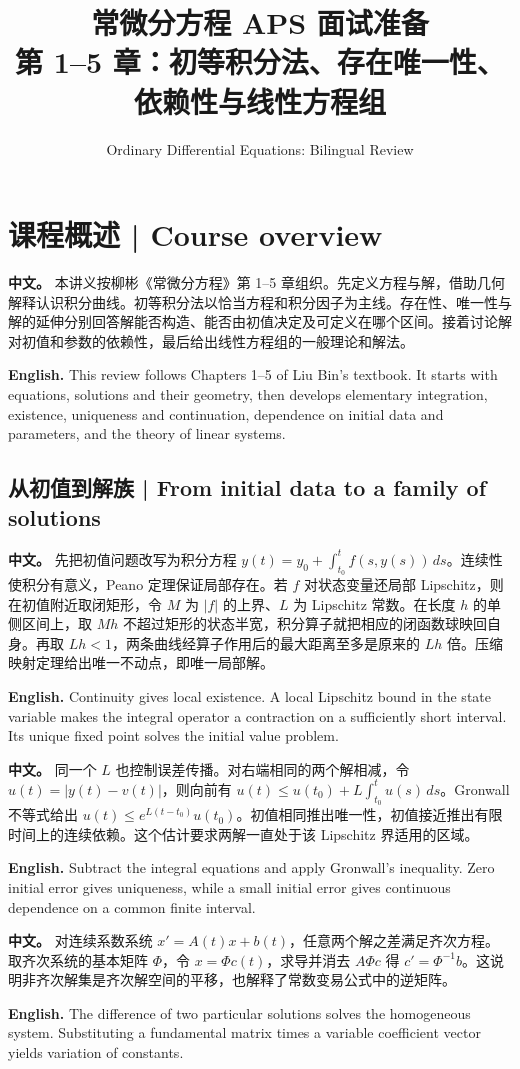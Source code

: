 \documentclass[UTF8,11pt,a4paper]{ctexart}
\title{常微分方程 APS 面试准备\\[4pt]\large 第 1--5 章：初等积分法、存在唯一性、依赖性与线性方程组}
\author{Ordinary Differential Equations: Bilingual Review}
\date{}
\newcommand{\APS}[2]{\par\noindent\textbf{中文。} #1\par\noindent\textbf{English.} #2\par}
\begin{document}
\maketitle
\section*{课程概述 | Course overview}
\APS{本讲义按柳彬《常微分方程》第 1--5 章组织。先定义方程与解，借助几何解释认识积分曲线。初等积分法以恰当方程和积分因子为主线。存在性、唯一性与解的延伸分别回答解能否构造、能否由初值决定及可定义在哪个区间。接着讨论解对初值和参数的依赖性，最后给出线性方程组的一般理论和解法。}{This review follows Chapters 1--5 of Liu Bin's textbook. It starts with equations, solutions and their geometry, then develops elementary integration, existence, uniqueness and continuation, dependence on initial data and parameters, and the theory of linear systems.}
\subsection*{从初值到解族 | From initial data to a family of solutions}
\APS{先把初值问题改写为积分方程 $y(t)=y_0+\int_{t_0}^t f(s,y(s))\,ds$。连续性使积分有意义，Peano 定理保证局部存在。若 $f$ 对状态变量还局部 Lipschitz，则在初值附近取闭矩形，令 $M$ 为 $|f|$ 的上界、$L$ 为 Lipschitz 常数。在长度 $h$ 的单侧区间上，取 $Mh$ 不超过矩形的状态半宽，积分算子就把相应的闭函数球映回自身。再取 $Lh<1$，两条曲线经算子作用后的最大距离至多是原来的 $Lh$ 倍。压缩映射定理给出唯一不动点，即唯一局部解。}{Continuity gives local existence. A local Lipschitz bound in the state variable makes the integral operator a contraction on a sufficiently short interval. Its unique fixed point solves the initial value problem.}
\APS{同一个 $L$ 也控制误差传播。对右端相同的两个解相减，令 $u(t)=|y(t)-v(t)|$，则向前有 $u(t)\le u(t_0)+L\int_{t_0}^t u(s)\,ds$。Gronwall 不等式给出 $u(t)\le e^{L(t-t_0)}u(t_0)$。初值相同推出唯一性，初值接近推出有限时间上的连续依赖。这个估计要求两解一直处于该 Lipschitz 界适用的区域。}{Subtract the integral equations and apply Gronwall's inequality. Zero initial error gives uniqueness, while a small initial error gives continuous dependence on a common finite interval.}
\APS{对连续系数系统 $x'=A(t)x+b(t)$，任意两个解之差满足齐次方程。取齐次系统的基本矩阵 $\Phi$，令 $x=\Phi c(t)$，求导并消去 $A\Phi c$ 得 $c'=\Phi^{-1}b$。这说明非齐次解集是齐次解空间的平移，也解释了常数变易公式中的逆矩阵。}{The difference of two particular solutions solves the homogeneous system. Substituting a fundamental matrix times a variable coefficient vector yields variation of constants.}
\end{document}
